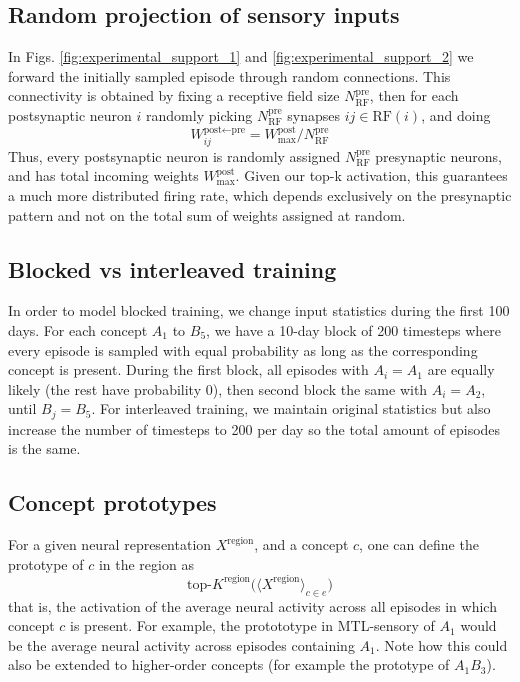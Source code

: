 \documentclass{article}
\begin{document}
\subsection*{Random projection of sensory inputs}
In Figs. \ref{fig:experimental_support_1} and \ref{fig:experimental_support_2} we forward the initially sampled episode through random connections. This connectivity is obtained by fixing a receptive field size $N_\textrm{RF}^\textrm{pre}$, then for each postsynaptic neuron $i$ randomly picking $N_\textrm{RF}^\textrm{pre}$ synapses $ij \in \textrm{RF}(i)$, and doing
\begin{equation}
    W^{\textrm{post}\leftarrow\textrm{pre}}_{ij} = W_\textrm{max}^\textrm{post}/N_\textrm{RF}^\textrm{pre}
\end{equation}
Thus, every postsynaptic neuron is randomly assigned $N_\textrm{RF}^\textrm{pre}$ presynaptic neurons, and has total incoming weights $W_\textrm{max}^\textrm{post}$. Given our top-k activation, this guarantees a much more distributed firing rate, which depends exclusively on the presynaptic pattern and not on the total sum of weights assigned at random.
\subsection*{Blocked vs interleaved training}
In order to model blocked training, we change input statistics during the first 100 days. For each concept $A_1$ to $B_5$, we have a 10-day block of 200 timesteps where every episode is sampled with equal probability as long as the corresponding concept is present. During the first block, all episodes with $A_i = A_1$ are equally likely (the rest have probability 0), then second block the same with $A_i = A_2$, until $B_j = B_5$. For interleaved training, we maintain original statistics but also increase the number of timesteps to 200 per day so the total amount of episodes is the same. 
\subsection*{Concept prototypes}
For a given neural representation $X^\textrm{region}$, and a concept $c$, one can define the prototype of $c$ in the region as
\begin{equation}
    \textrm{top-}K^\textrm{region}\big(\langle X^\textrm{region} \rangle_{c \in e}\big)
    \label{eq:prototype}
\end{equation}
that is, the activation of the average neural activity across all episodes in which concept $c$ is present. For example, the protototype in MTL-sensory of $A_1$ would be the average neural activity across episodes containing $A_1$. Note how this could also be extended to higher-order concepts (for example the prototype of $A_1B_3$).
\end{document}
